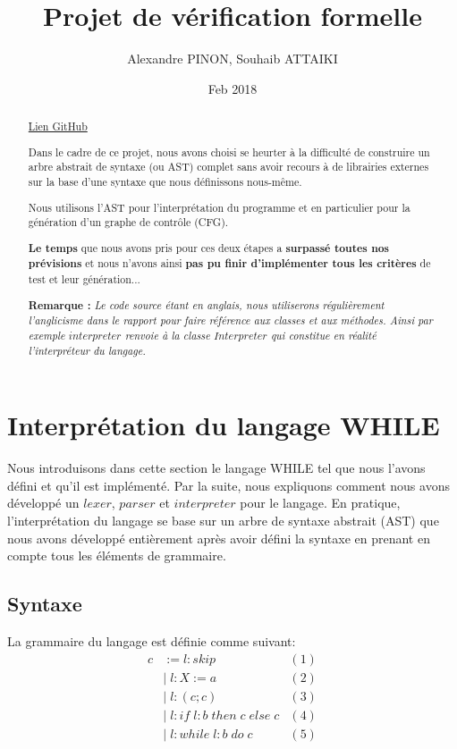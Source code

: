 \documentclass[a4paper]{article}
\title{Projet de vérification formelle}
\author{Alexandre PINON, Souhaib ATTAIKI}
\date{Feb 2018}
\begin{document}
\maketitle

\begin{abstract}

\href{https://github.com/souhaibattaiki/ivf-program-verifier}{Lien GitHub}

Dans le cadre de ce projet, nous avons choisi se heurter à la difficulté de construire un arbre abstrait de syntaxe (ou AST) complet sans avoir recours à de librairies externes sur la base d'une syntaxe que nous définissons nous-même. 

Nous utilisons l'AST pour l'interprétation du programme et en particulier pour la génération d'un graphe de contrôle (CFG). 

\textbf{Le temps} que nous avons pris pour ces deux étapes a \textbf{surpassé toutes nos prévisions} et nous n'avons ainsi \textbf{pas pu finir d'implémenter tous les critères} de test et leur génération...

\textbf{Remarque :}\textit{ Le code source étant en anglais, nous utiliserons régulièrement l’anglicisme dans le rapport pour faire référence aux classes et aux méthodes. Ainsi par exemple $interpreter$ renvoie à la classe $Interpreter$ qui constitue en réalité l'interpréteur du langage.}
\end{abstract}

\tableofcontents

\newpage

\section{Interprétation du langage WHILE}

Nous introduisons dans cette section le langage WHILE tel que nous l'avons défini et qu'il est implémenté. Par la suite, nous expliquons comment nous avons développé un $lexer$, $parser$ et $interpreter$ pour le langage. En pratique, l'interprétation du langage se base sur un arbre de syntaxe abstrait (AST) que nous avons développé entièrement après avoir défini la syntaxe en prenant en compte tous les éléments de grammaire. 

\subsection{Syntaxe} 

La grammaire du langage est définie comme suivant:
\begin{align*}
c & := l : skip & (1) \\ 
  & | \;  l : X := a & (2)\\
  & | \;  l : (c;c)  & (3)\\
  & | \;  l : if \; l : b \; then \; c \; else \; c & (4) \\ 
  & | \; l : while \; l : b \; do \;c & (5)
 \end{align*}
\end{document}
